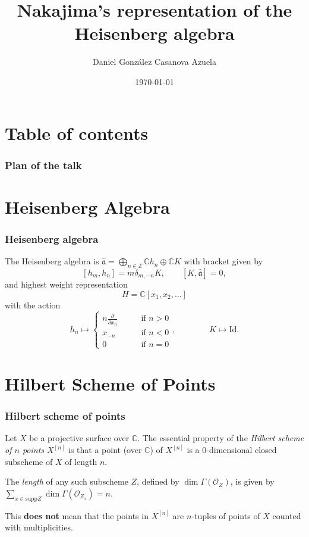 \documentclass{beamer}
\title{Nakajima's representation of the Heisenberg algebra}
\author{Daniel González Casanova Azuela}
\institute{PUC-Rio}
\date{\today}
\begin{document}
\begin{frame}%
\titlepage
\end{frame}

\section*{Table of contents}
\label{section-toc}

\begin{frame}%
\frametitle{Plan of the talk}
\tableofcontents
\end{frame}

\section{Heisenberg Algebra}

\begin{frame}%
\frametitle{Heisenberg algebra}
The Heisenberg algebra is
$
\hat{\mathfrak{a}}=
\bigoplus_{n \in \mathbb{Z}} \mathbb{C}h_n \oplus\mathbb{C}K
$
with bracket given by 
$$
[h_m,h_n]=m\delta_{m,-n}K,\qquad 
[K,\hat{\mathfrak{a}}]=0,
$$
and highest weight representation 
$$
H=\mathbb{C}[x_1,x_2,\ldots]$$
with the action
$$
h_n\mapsto \begin{cases}
n \frac{\partial }{\partial x_n}\qquad &\text{if }n>0\\
x_{-n}\qquad &\text{if }n<0\\
0\qquad &\text{if }n=0
\end{cases},
\qquad \qquad  K\mapsto \text{Id}.
$$
\end{frame}

\section{Hilbert Scheme of Points}

\begin{frame}%
\frametitle{Hilbert scheme of points}
Let $X$ be a projective surface over $\mathbb{C}$.
The essential property of the 
{\it Hilbert scheme
of $n$ points $X^{[n]}$}
is that a point (over $\mathbb{C}$) of $X^{[n]}$
is a 0-dimensional closed subscheme of $X$
of length $n$.

\medskip\noindent
\pause
The {\it length} of any such subscheme $Z$, defined by
 $\dim\Gamma(\mathcal{O}_Z)$,
is given by
$\sum_{x \in \text{supp} Z}\dim\Gamma(\mathcal{O}_{Z_x})=n$.

\medskip\noindent
\pause
This {\bf does not} mean that the points in $X^{[n]}$ 
are $n$-tuples of points of $X$ counted with multiplicities.
\end{frame}
\end{document}
